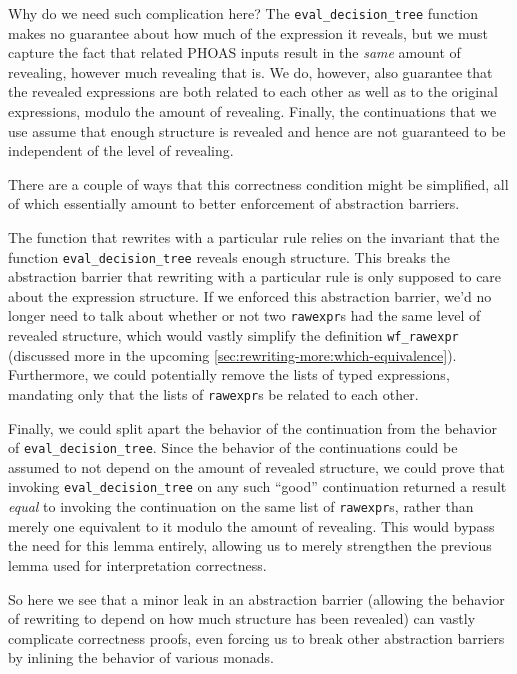 Why do we need such complication here?
The \texttt{eval_decision_tree} function makes no guarantee about how much of the expression it reveals, but we must capture the fact that related PHOAS inputs result in the \emph{same} amount of revealing, however much revealing that is.
We do, however, also guarantee that the revealed expressions are both related to each other as well as to the original expressions, modulo the amount of revealing.
Finally, the continuations that we use assume that enough structure is revealed and hence are not guaranteed to be independent of the level of revealing.

There are a couple of ways that this correctness condition might be simplified, all of which essentially amount to better enforcement of abstraction barriers.

The function that rewrites with a particular rule relies on the invariant that the function \texttt{eval_decision_tree} reveals enough structure.
This breaks the abstraction barrier that rewriting with a particular rule is only supposed to care about the expression structure.
If we enforced this abstraction barrier, we'd no longer need to talk about whether or not two \texttt{rawexpr}s had the same level of revealed structure, which would vastly simplify the definition \texttt{wf_rawexpr} (discussed more in the upcoming \autoref{sec:rewriting-more:which-equivalence}).
Furthermore, we could potentially remove the lists of typed expressions, mandating only that the lists of \texttt{rawexpr}s be related to each other.

Finally, we could split apart the behavior of the continuation from the behavior of \texttt{eval_decision_tree}.
Since the behavior of the continuations could be assumed to not depend on the amount of revealed structure, we could prove that invoking \texttt{eval_decision_tree} on any such ``good'' continuation returned a result \emph{equal} to invoking the continuation on the same list of \texttt{rawexpr}s, rather than merely one equivalent to it modulo the amount of revealing.
This would bypass the need for this lemma entirely, allowing us to merely strengthen the previous lemma used for interpretation correctness.

So here we see that a minor leak in an abstraction barrier (allowing the behavior of rewriting to depend on how much structure has been revealed) can vastly complicate correctness proofs, even forcing us to break other abstraction barriers by inlining the behavior of various monads.
\label{sec:break-abstraction:example:eval-decision-tree}

